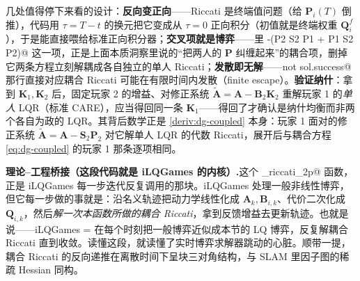 几处值得停下来看的设计：\textbf{反向变正向}——Riccati 是终端值问题（给 $\mathbf P_i(T)$ 倒推），代码用 $\tau=T-t$ 的换元把它变成从 $\tau=0$ 正向积分（初值就是终端权重 $\mathbf Q_i^f$），于是能直接喂给标准正向积分器；\textbf{交叉项就是博弈}——\verb@deriv@ 里 \verb@-(P2 S2 P1 + P1 S2 P2)@ 这一项，正是上面本质洞察里说的“把两人的 $\mathbf P$ 纠缠起来”的耦合项，删掉它两条方程立刻解耦成各自独立的单人 Riccati；\textbf{发散即无解}——\verb@if not sol.success@ 那行直接对应耦合 Riccati 可能在有限时间内发散（finite escape）。\textbf{验证纳什}：拿到 $\mathbf K_1,\mathbf K_2$ 后，固定玩家 2 的增益、对修正系统 $\tilde{\mathbf A}=\mathbf A-\mathbf B_2\mathbf K_2$ 重解玩家 1 的\emph{单人} LQR（标准 CARE），应当得回同一条 $\mathbf K_1$——得回了才确认是纳什均衡而非两个各自为政的 LQR。其背后数学正是 \cref{deriv:dg-coupled} 本身：玩家 1 面对的修正系统 $\tilde{\mathbf A}=\mathbf A-\mathbf S_2\mathbf P_2$ 对它解单人 LQR 的代数 Riccati，展开后与耦合方程 \cref{eq:dg-coupled} 的玩家 1 那条逐项相同。

\begin{note}
\textbf{理论--工程桥接（这段代码就是 iLQGames 的内核）.}\;这个 \verb@coupled_riccati_2p@ 函数，正是 iLQGames 每一步迭代反复调用的那块。iLQGames 处理一般非线性博弈，但它每一步做的事就是：沿名义轨迹把动力学线性化成 $\mathbf A_k,\mathbf B_{i,k}$、代价二次化成 $\mathbf Q_{i,k}$，然后\emph{解一次本函数所做的耦合 Riccati}，拿到反馈增益去更新轨迹。也就是说——iLQGames = 在每个时刻把一般博弈近似成本节的 LQ 博弈，反复解耦合 Riccati 直到收敛。读懂这段，就读懂了实时博弈求解器跳动的心脏。顺带一提，耦合 Riccati 的反向递推在离散时间下呈块三对角结构，与 SLAM 里因子图的稀疏 Hessian 同构。
\end{note}

